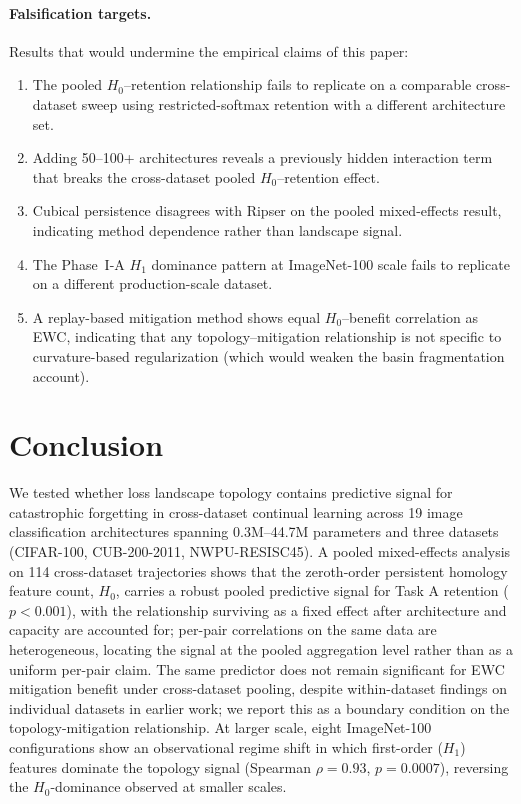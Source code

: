 \documentclass[10pt,twocolumn]{article}
\begin{document}
\paragraph{Falsification targets.} Results that would undermine the empirical claims of this paper:
\begin{enumerate}
    \item The pooled $H_0$--retention relationship fails to replicate on a comparable cross-dataset sweep using restricted-softmax retention with a different architecture set.
    \item Adding 50--100+ architectures reveals a previously hidden interaction term that breaks the cross-dataset pooled $H_0$--retention effect.
    \item Cubical persistence disagrees with Ripser on the pooled mixed-effects result, indicating method dependence rather than landscape signal.
    \item The Phase~I-A $H_1$ dominance pattern at ImageNet-100 scale fails to replicate on a different production-scale dataset.
    \item A replay-based mitigation method shows equal $H_0$--benefit correlation as EWC, indicating that any topology--mitigation relationship is not specific to curvature-based regularization (which would weaken the basin fragmentation account).
\end{enumerate}

\section{Conclusion}
\label{sec:conclusion}

We tested whether loss landscape topology contains predictive signal for catastrophic forgetting in cross-dataset continual learning across 19 image classification architectures spanning 0.3M--44.7M parameters and three datasets (CIFAR-100, CUB-200-2011, NWPU-RESISC45). A pooled mixed-effects analysis on 114 cross-dataset trajectories shows that the zeroth-order persistent homology feature count, $H_0$, carries a robust pooled predictive signal for Task A retention ($p < 0.001$), with the relationship surviving as a fixed effect after architecture and capacity are accounted for; per-pair correlations on the same data are heterogeneous, locating the signal at the pooled aggregation level rather than as a uniform per-pair claim. The same predictor does not remain significant for EWC mitigation benefit under cross-dataset pooling, despite within-dataset findings on individual datasets in earlier work; we report this as a boundary condition on the topology-mitigation relationship. At larger scale, eight ImageNet-100 configurations show an observational regime shift in which first-order ($H_1$) features dominate the topology signal (Spearman $\rho = 0.93$, $p = 0.0007$), reversing the $H_0$-dominance observed at smaller scales.
\end{document}
